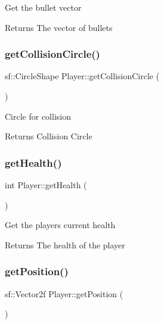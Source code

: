 Get the bullet vector 

\begin{DoxyReturn}{Returns}
The vector of bullets
\end{DoxyReturn}
\mbox{\label{class_player_a961473d7916a7e8c47ae1752ba6498bc}} 
\subsubsection{\texorpdfstring{getCollisionCircle()}{getCollisionCircle()}}
{\footnotesize\ttfamily sf\+::\+Circle\+Shape Player\+::get\+Collision\+Circle (\begin{DoxyParamCaption}{ }\end{DoxyParamCaption})}



Circle for collision 

\begin{DoxyReturn}{Returns}
Collision Circle
\end{DoxyReturn}
\mbox{\label{class_player_abcb15d249bed9a4ab0ab86b52b0d747a}} 
\subsubsection{\texorpdfstring{getHealth()}{getHealth()}}
{\footnotesize\ttfamily int Player\+::get\+Health (\begin{DoxyParamCaption}{ }\end{DoxyParamCaption})}



Get the players current health 

\begin{DoxyReturn}{Returns}
The health of the player
\end{DoxyReturn}
\mbox{\label{class_player_a23356f99a9de86d3d47eadb679b332dc}} 
\subsubsection{\texorpdfstring{getPosition()}{getPosition()}}
{\footnotesize\ttfamily sf\+::\+Vector2f Player\+::get\+Position (\begin{DoxyParamCaption}{ }\end{DoxyParamCaption})}



